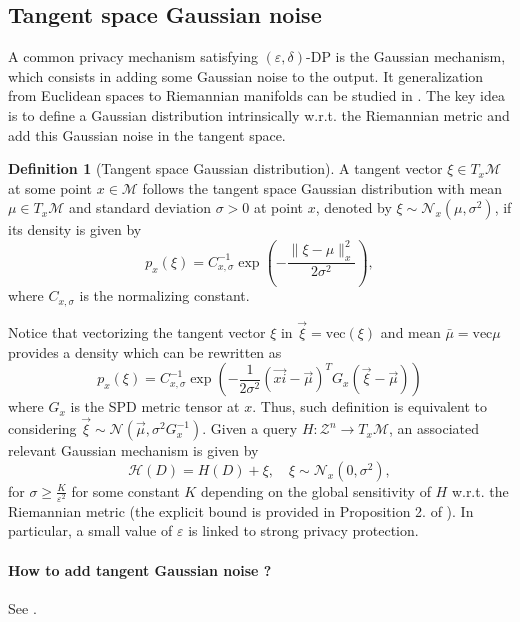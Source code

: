 \documentclass[10pt,a4paper]{book}
\theoremstyle{definition}
\newtheorem{defn}{Definition}[section]
\theoremstyle{plain}
\theoremstyle{remark}
\newcommand \M {\mathcal{M}}
\begin{document}
\subsection{Tangent space Gaussian noise}
A common privacy mechanism satisfying $(\varepsilon,\delta)$-DP is the Gaussian mechanism, which consists in adding some Gaussian noise to the output. It generalization from Euclidean spaces to Riemannian manifolds can be studied in \cite{han2024differentially}. The key idea is to define a Gaussian distribution intrinsically w.r.t. the Riemannian metric and add this Gaussian noise in the tangent space. 
\begin{defn}[Tangent space Gaussian distribution]
A tangent vector $\xi\in T_{x}\M$ at some point $x\in \M$ follows the tangent space Gaussian distribution with mean $\mu\in T_x\M$ and standard deviation $\sigma>0$ at point $x$, denoted by $\xi\sim\mathcal{N}_{x}(\mu,\sigma^2)$, if its density is given by
$$p_x(\xi)=C_{x,\sigma}^{-1}\exp\left(-\frac{\|\xi-\mu\|_{x}^{2}}{2\sigma^2}\right),$$
where $C_{x,\sigma}$ is the normalizing constant.
\end{defn}
Notice that vectorizing the tangent vector $\xi$ in $\vec{\xi}=\text{vec}(\xi)$ and mean $\bar{\mu}=\text{vec}{\mu}$ provides a density which can be rewritten as
$$p_{x}(\xi)=C_{x,\sigma}^{-1}\exp\left(-\frac{1}{2\sigma^2}(\vec{xi}-\vec{\mu})^{T}G_x(\vec{\xi}-\vec{\mu})\right)$$
where $G_x$ is the SPD metric tensor at $x$. Thus, such definition is equivalent to considering $\vec{\xi}\sim\mathcal{N}(\vec{\mu},\sigma^{2}G_x^{-1})$. 
Given a query $H:\mathcal{Z}^{n}\to T_x\M$, an associated relevant Gaussian mechanism is given by
$$\mathcal{H}(D)=H(D)+\xi,\quad \xi \sim\mathcal{N}_x(0,\sigma^2),$$
for $\sigma\ge \frac{K}{\varepsilon^2}$ for some constant $K$ depending on the global sensitivity of $H$ w.r.t. the Riemannian metric (the explicit bound is provided in Proposition 2. of \cite{han2024differentially}). In particular, a small value of $\varepsilon$ is linked to strong privacy protection. 

\paragraph{How to add tangent Gaussian noise ?} See \cite{utpala2022improved}.
\end{document}
